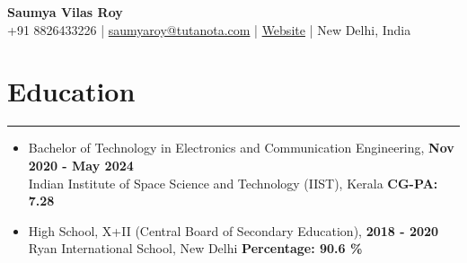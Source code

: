 \documentclass[11pt]{article}
\newlength{\sectionvspace}
\newlength{\sectionvspacee}
\newlength{\sectionvspaceeq}
\begin{document}
	
	\begin{center}
		{\huge\bf Saumya Vilas Roy} \\
		
		\vspace{3mm} %
		{\large
			+91 8826433226 |
			\href{mailto:saumyaroy@tutanota.com}{saumyaroy@tutanota.com} |
			\href{https://caffineaddic.github.io/}{Website} |
			New Delhi, India
		} \\
		{
			
		}
	\end{center}
\begin{comment}
			\vspace{\sectionvspacee}
	\vspace{\sectionvspace}
	\section*{\bf Summary}
	\vspace{\sectionvspace}
	\rule{\textwidth}{0.4pt}
	\begin{itemize}[leftmargin=*,noitemsep,topsep=0pt]
		\item Machine Learning/Deep (ML/DL) Learning researcher with 2.5 years of data analysis experience
		\item Skilled in ML/DL, Electronics, and Communication with an emphasis on biomedical data analysis
		\item Committed to developing innovative solutions in interdisciplinary projects
		\item Interested in ML/DL research opportunities in health and biomedical applications
	\end{itemize}
\end{comment}
	
		\vspace{\sectionvspacee}
	\section*{\bf Education}
	\vspace{\sectionvspace}
	\rule{\textwidth}{0.4pt}
	\begin{itemize}[leftmargin=*,noitemsep,topsep=0pt]
		\item Bachelor of Technology in Electronics and Communication Engineering, \hfill \textbf{Nov 2020 - May 2024} \\
		Indian Institute of Space Science and Technology (IIST), Kerala \hfill \textbf{CG-PA: 7.28}
		\vspace{\sectionvspaceeq}
		\item High School, X+II (Central Board of Secondary Education), \hfill \textbf{2018 - 2020}\\
		Ryan International School, New Delhi   \hfill \textbf{Percentage: 90.6 \%}
	\end{itemize}
	
\end{document}
